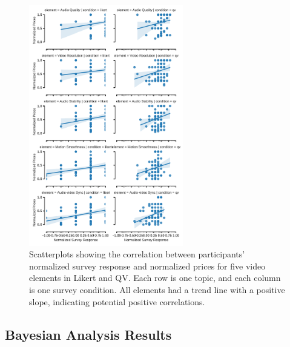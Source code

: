 \begin{figure}[htpb]
    \centering
    \includegraphics[width=0.6\textwidth, keepaspectratio=true]{content/image/correlation_per_element.pdf}
    \caption{
      Scatterplots showing the correlation between participants' normalized survey response and normalized prices for five video elements in Likert and QV. Each row is one topic, and each column is one survey condition. All elements had a trend line with a positive slope, indicating potential positive correlations.
    }
    \label{fig:topic_covariate_exp2}
\end{figure}


\subsection{Bayesian Analysis Results}


